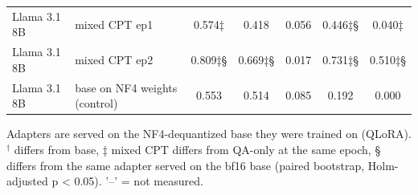 \begin{table}[t]
{\begin{tabular}{llccccc}
Llama 3.1 8B & mixed CPT ep1 & 0.574‡ & 0.418 & 0.056 & 0.446‡§ & 0.040‡ \\
Llama 3.1 8B & mixed CPT ep2 & 0.809‡§ & 0.669‡§ & 0.017 & 0.731‡§ & 0.510‡§ \\
Llama 3.1 8B & base on NF4 weights (control) & 0.553 & 0.514 & 0.085 & 0.192 & 0.000 \\
\bottomrule
\end{tabular}}
\par\smallskip\footnotesize Adapters are served on the NF4-dequantized base they were trained on (QLoRA). $^\dagger$ differs from base, ‡ mixed CPT differs from QA-only at the same epoch, § differs from the same adapter served on the bf16 base (paired bootstrap, Holm-adjusted p < 0.05). '–' = not measured.
\end{table}

